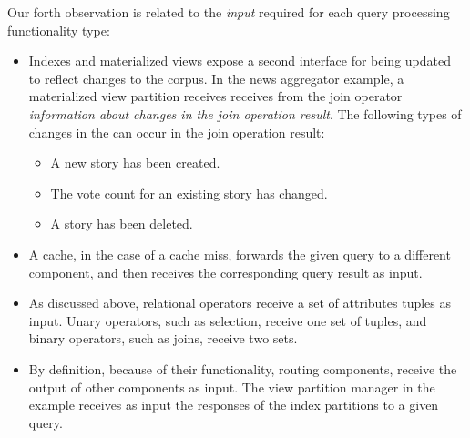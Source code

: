 \noindent
Our forth observation is related to the \textit{input} required for each query processing functionality type:
\begin{itemize}
  \item Indexes and materialized views expose a second interface for being updated to reflect changes to the corpus.
  In the news aggregator example, a materialized view partition receives receives from the join operator
  \textit{information about changes in the join operation result}.
  The following types of changes in the can occur in the join operation result:
  \begin{itemize}
    \item A new story has been created.
    \item The vote count for an existing story has changed.
    \item A story has been deleted.
  \end{itemize}


  \item A cache, in the case of a cache miss, forwards the given query to a different component,
  and then receives the corresponding query result as input.

  \item As discussed above, relational operators receive a set of attributes tuples as input.
  Unary operators, such as selection, receive one set of tuples,
  and binary operators, such as joins, receive two sets.

  \item By definition, because of their functionality, routing components, receive the output of other components as input.
  The view partition manager in the example receives as input the responses of the index partitions to a given query.
\end{itemize}

